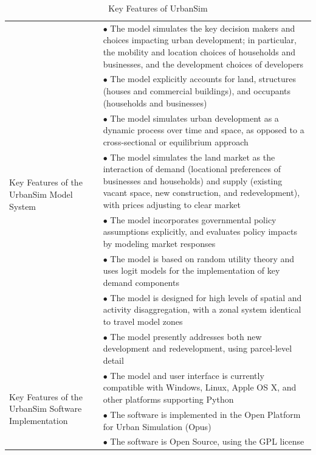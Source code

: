 \begin{table}[htp]
\caption{Key Features of UrbanSim}
\label{tab:key-features}
\begin{center}
\begin{tabular}{ p{1.5in}  p{4.4in}  }
\toprule[1.5pt]
\multirow{8}{1.5in}{Key Features of the UrbanSim
Model System} &  $\bullet$   The model simulates the key decision makers and
choices impacting urban development; in particular, the mobility and
location choices of households and businesses, and the development
choices of developers\\
&  $\bullet$   The model explicitly accounts for land, structures (houses and commercial buildings), and occupants (households and businesses)\\
&  $\bullet$   The model simulates urban development as a dynamic process over time and space, as opposed to a cross-sectional or equilibrium approach\\
&  $\bullet$   The model simulates the land market as the interaction of demand (locational preferences of businesses and households) and supply (existing vacant space, new construction, and redevelopment), with prices adjusting to clear market\\
& $\bullet$    The model incorporates governmental policy assumptions explicitly, and evaluates policy impacts by modeling market responses\\
& $\bullet$    The model is based on random utility theory and uses logit models for the implementation of key demand components\\
& $\bullet$    The model is designed for high levels of spatial and activity disaggregation, with a zonal system identical to travel model zones\\
& $\bullet$    The model presently addresses both new development and redevelopment, using parcel-level detail\\
\midrule
\multirow{8}{1,5in}{Key Features of the UrbanSim Software Implementation}
&  $\bullet$   The model and user interface is currently compatible with Windows, Linux, Apple OS X, and other platforms supporting Python\\
& $\bullet$  The software is implemented in the Open Platform for Urban Simulation (Opus)\\
& $\bullet$  The software is Open Source, using the GPL license\\

\end{tabular}
\end{center}
\end{table}

